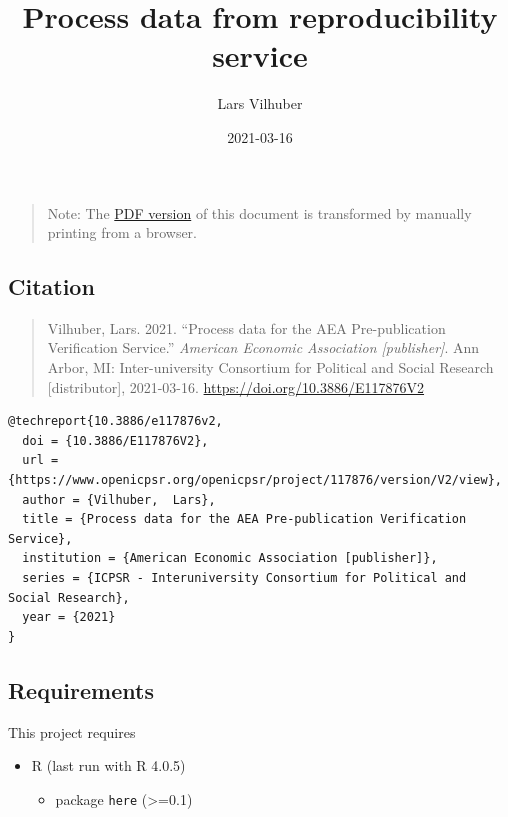 \documentclass[
]{article}
\title{Process data from reproducibility service}
\author{Lars Vilhuber}
\date{2021-03-16}
\providecommand{\tightlist}{%
  \setlength{\itemsep}{0pt}\setlength{\parskip}{0pt}}
\begin{document}
\maketitle

{
\setcounter{tocdepth}{2}
\tableofcontents
}
\begin{quote}
Note: The
\href{https://aeadataeditor.github.io/processing-jira-process-data/README.pdf}{PDF
version} of this document is transformed by manually printing from a
browser.
\end{quote}

\hypertarget{citation}{%
\subsection{Citation}\label{citation}}

\begin{quote}
Vilhuber, Lars. 2021. ``Process data for the AEA Pre-publication
Verification Service.'' \emph{American Economic Association
{[}publisher{]}}. Ann Arbor, MI: Inter-university Consortium for
Political and Social Research {[}distributor{]}, 2021-03-16.
\url{https://doi.org/10.3886/E117876V2}
\end{quote}

\begin{verbatim}
@techreport{10.3886/e117876v2,
  doi = {10.3886/E117876V2},
  url = {https://www.openicpsr.org/openicpsr/project/117876/version/V2/view},
  author = {Vilhuber,  Lars},
  title = {Process data for the AEA Pre-publication Verification Service},
  institution = {American Economic Association [publisher]},
  series = {ICPSR - Interuniversity Consortium for Political and Social Research},
  year = {2021}
}
\end{verbatim}

\hypertarget{requirements}{%
\subsection{Requirements}\label{requirements}}

This project requires

\begin{itemize}
\tightlist
\item
  R (last run with R 4.0.5)

  \begin{itemize}
  \tightlist
  \item
    package \texttt{here} (\textgreater=0.1)
  \end{itemize}
\end{itemize}
\end{document}

